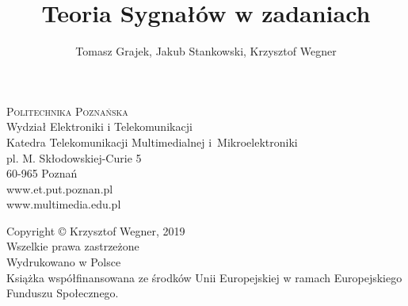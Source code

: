 \documentclass[a4paper,11pt]{LambBook} %
\def\booktitle{Teoria Sygnałów w zadaniach}
\def\bookauthors{Tomasz Grajek, Jakub Stankowski, Krzysztof Wegner}
\begin{document}
\title{\booktitle}
\author{\bookauthors}
\label{page:titlepage}
\makebooktitle
\thispagestyle{empty}
\begin{flushleft}
\textsc{Politechnika Poznańska}\\%
Wydział Elektroniki i Telekomunikacji\\%
Katedra Telekomunikacji Multimedialnej i~Mikroelektroniki\\[1em]

pl. M. Skłodowskiej-Curie 5\\
60-965 Poznań\\[1em]

www.et.put.poznan.pl\\
www.multimedia.edu.pl
\end{flushleft}

\vfill

\begin{flushleft}
Copyright © Krzysztof Wegner, 2019\\
Wszelkie prawa zastrzeżone\\
Wydrukowano w Polsce\\[1em]

Książka współfinansowana ze środków Unii Europejskiej w ramach Europejskiego Funduszu Społecznego.\\
\end{flushleft}
\clearpage
%
%
%
%
%
%
%
%
%
%
%
%
\end{document}
